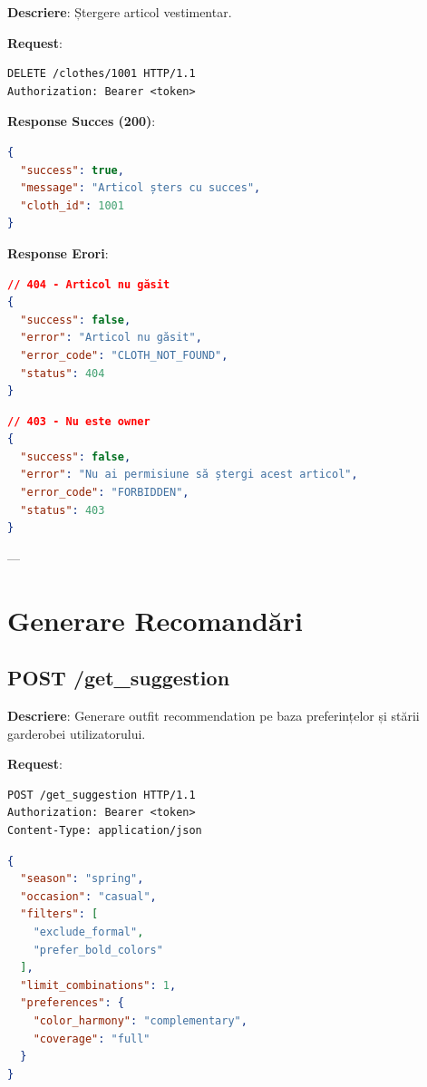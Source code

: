 \textbf{Descriere}: Ștergere articol vestimentar.

\textbf{Request}:

\begin{lstlisting}[language=HTTP]
DELETE /clothes/1001 HTTP/1.1
Authorization: Bearer <token>
\end{lstlisting}

\textbf{Response Succes (200)}:

\begin{lstlisting}[language=JSON]
{
  "success": true,
  "message": "Articol șters cu succes",
  "cloth_id": 1001
}
\end{lstlisting}

\textbf{Response Erori}:

\begin{lstlisting}[language=JSON]
// 404 - Articol nu găsit
{
  "success": false,
  "error": "Articol nu găsit",
  "error_code": "CLOTH_NOT_FOUND",
  "status": 404
}
\end{lstlisting}

\begin{lstlisting}[language=JSON]
// 403 - Nu este owner
{
  "success": false,
  "error": "Nu ai permisiune să ștergi acest articol",
  "error_code": "FORBIDDEN",
  "status": 403
}
\end{lstlisting}

---

\section{Generare Recomandări}

\subsection{POST /get\_suggestion}

\textbf{Descriere}: Generare outfit recommendation pe baza preferințelor și stării garderobei utilizatorului.

\textbf{Request}:

\begin{lstlisting}[language=HTTP]
POST /get_suggestion HTTP/1.1
Authorization: Bearer <token>
Content-Type: application/json
\end{lstlisting}

\begin{lstlisting}[language=JSON]
{
  "season": "spring",
  "occasion": "casual",
  "filters": [
    "exclude_formal",
    "prefer_bold_colors"
  ],
  "limit_combinations": 1,
  "preferences": {
    "color_harmony": "complementary",
    "coverage": "full"
  }
}
\end{lstlisting}

